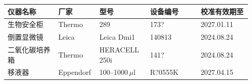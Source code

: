 \documentclass[UTF8,10pt,a4paper,fontset=fandol]{ctexart}
\newcommand{\fieldvalue}[1]{#1}
\newcommand{\handwritten}[1]{#1}
\begin{document}
\begin{center}
\small
\begin{tabular}{|p{0.20\linewidth}|p{0.15\linewidth}|p{0.20\linewidth}|p{0.20\linewidth}|p{0.20\linewidth}|}
\hline
仪器名称 & 厂家 & 型号 & 设备编号 & 校准有效期至\\
\hline
生物安全柜 &
\fieldvalue{Thermo} &
\fieldvalue{\handwritten{289}} &
\fieldvalue{\handwritten{173?}} &
\fieldvalue{\handwritten{2027.01.11}}\\
\hline
倒置显微镜 &
\fieldvalue{Leica} &
\fieldvalue{Leica Dmi1} &
\fieldvalue{\handwritten{140813}} &
\fieldvalue{\handwritten{2024.08.24}}\\
\hline
二氧化碳培养箱 &
\fieldvalue{Thermo} &
\fieldvalue{HERACELL 250i} &
\fieldvalue{\handwritten{141?}} &
\fieldvalue{\handwritten{2024.08.24}}\\
\hline
移液器 &
\fieldvalue{Eppendorf} &
\fieldvalue{\handwritten{100--1000\,$\mu$l}} &
\fieldvalue{\handwritten{R?0555K}} &
\fieldvalue{\handwritten{2027.04.15}}\\
\hline
\end{tabular}
\end{center}
\end{document}
